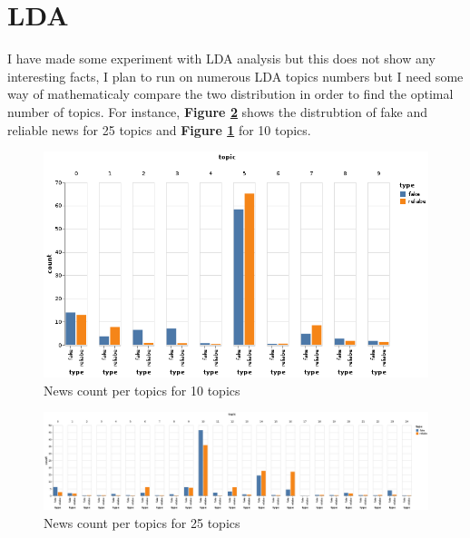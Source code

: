 \documentclass[11pt,a4paper,oneside]{report}
\begin{document}
\section{LDA}

I have made some experiment with LDA analysis but this does not show any interesting facts, I plan to run on numerous LDA topics numbers but I need some way of mathematicaly compare the two distribution in order to find the optimal number of topics. For instance, \textbf{Figure \ref{fig:lda25}} shows the distrubtion of fake and reliable news for 25 topics and \textbf{Figure \ref{fig:lda10}} for 10 topics. 

\begin{figure}[h]
	\centering
	\includegraphics[width=\textwidth]{output/lda_10.png}
	\caption{News count per topics for 10 topics}
	\label{fig:lda10}
\end{figure}

\begin{figure}[h]
	\centering
	\includegraphics[width=\textwidth]{output/lda_25.png}
	\caption{News count per topics for 25 topics}
	\label{fig:lda25}
\end{figure}



\end{document}
